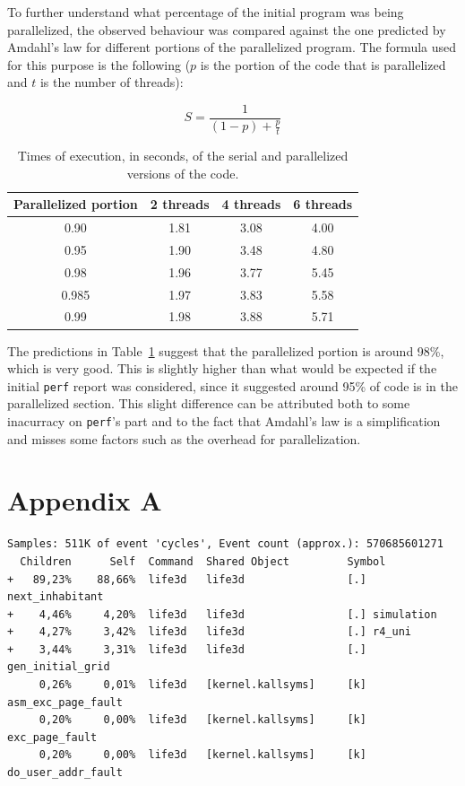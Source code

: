 \documentclass{article}
\begin{document}
To further understand what percentage of the initial program was being parallelized,
the observed behaviour was compared against the one predicted by Amdahl's law
for different portions of the parallelized program. The formula used for this 
purpose is the following ($p$ is the portion of the code that is parallelized and $t$ is 
the number of threads): 

\begin{equation}
	S = \frac{1}{(1-p) + \frac{p}{t}}
\end{equation}

\begin{table}[h!]
	\centering
	\begin{tabular}{||c c c c||} 
	 \hline
	 Parallelized portion & 2 threads & 4 threads & 6 threads \\ [0.5ex] 
	 \hline\hline
	 0.90 & 1.81 & 3.08 & 4.00 \\ 
	 0.95 & 1.90 & 3.48 & 4.80 \\ 
	 0.98 & 1.96 & 3.77 & 5.45 \\ 
	 0.985 & 1.97 & 3.83 & 5.58 \\ 
	 0.99 & 1.98 & 3.88 & 5.71 \\ [1ex] 
	 \hline
	\end{tabular}
	\caption{Times of execution, in seconds, of the serial and parallelized versions of the code.}
	\label{amdahl}
\end{table}

The predictions in Table~\ref{amdahl} suggest that the parallelized portion is
around 98\%, which is very good. This is slightly higher than what would be
expected if the initial \texttt{perf} report was considered, since it suggested
around 95\% of code is in the parallelized section. This slight difference
can be attributed both to some inacurracy on \texttt{perf}'s part and to the
fact that Amdahl's law is a simplification and misses some factors such as the
overhead for parallelization.

\section{Appendix A}

\begin{lstlisting}[caption={\texttt{perf} report on run with $n=1024$ and $3$
generations}]
Samples: 511K of event 'cycles', Event count (approx.): 570685601271
  Children      Self  Command  Shared Object         Symbol
+   89,23%    88,66%  life3d   life3d                [.] next_inhabitant
+    4,46%     4,20%  life3d   life3d                [.] simulation
+    4,27%     3,42%  life3d   life3d                [.] r4_uni
+    3,44%     3,31%  life3d   life3d                [.] gen_initial_grid
     0,26%     0,01%  life3d   [kernel.kallsyms]     [k] asm_exc_page_fault
     0,20%     0,00%  life3d   [kernel.kallsyms]     [k] exc_page_fault
     0,20%     0,00%  life3d   [kernel.kallsyms]     [k] do_user_addr_fault
\end{lstlisting}
\end{document}
